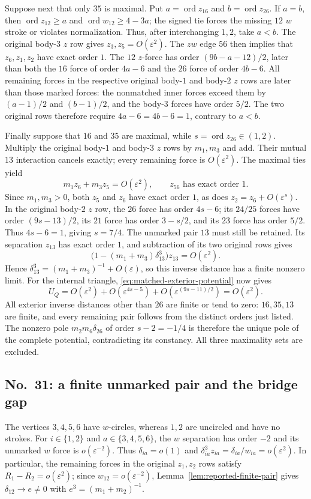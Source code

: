 \documentclass[11pt]{amsart}
\theoremstyle{remark}
\newcommand{\ord}{\operatorname{ord}}
\begin{document}
Suppose next that only $35$ is maximal. Put $a=\ord z_{16}$ and $b=\ord z_{26}$.
If $a=b$, then $\ord z_{12}\ge a$ and $\ord w_{12}\ge4-3a$; the signed tie forces the missing $12$ $w$ stroke or violates normalization. Thus, after interchanging $1,2$, take $a<b$.
The original body-$3$ $z$ row gives $z_3,z_5=O(\varepsilon^2)$.
The $zw$ edge $56$ then implies that $z_6,z_1,z_2$ have exact order $1$.
The $12$ $z$-force has order $(9b-a-12)/2$, later than both the $16$ force of order $4a-6$ and the $26$ force of order $4b-6$.
All remaining forces in the respective original body-$1$ and body-$2$ $z$ rows are later than those marked forces: the nonmatched inner forces exceed them by $(a-1)/2$ and $(b-1)/2$, and the body-$3$ forces have order $5/2$.
The two original rows therefore require $4a-6=4b-6=1$, contrary to $a<b$.

Finally suppose that $16$ and $35$ are maximal, while $s=\ord z_{26}\in(1,2)$.
Multiply the original body-$1$ and body-$3$ $z$ rows by $m_1,m_3$ and add.
Their mutual $13$ interaction cancels exactly; every remaining force is $O(\varepsilon^2)$.
The maximal ties yield
\[
 m_1z_6+m_3z_5=O(\varepsilon^2),\qquad
 z_{56}\text{ has exact order }1.
\]
Since $m_1,m_3>0$, both $z_5$ and $z_6$ have exact order $1$, as does $z_2=z_6+O(\varepsilon^s)$.
In the original body-$2$ $z$ row, the $26$ force has order $4s-6$; its $24/25$ forces have order $(9s-13)/2$, its $21$ force has order $3-s/2$, and its $23$ force has order $5/2$.
Thus $4s-6=1$, giving $s=7/4$.
The unmarked pair $13$ must still be retained. Its separation $z_{13}$ has exact order $1$, and subtraction of its two original rows gives
\[
 \bigl(1-(m_1+m_3)\delta_{13}^3\bigr)z_{13}=O(\varepsilon^2).
\]
Hence $\delta_{13}^3=(m_1+m_3)^{-1}+O(\varepsilon)$, so this inverse distance has a finite nonzero limit.
For the internal triangle, \eqref{eq:matched-exterior-potential} now gives
\[
 U_Q=O(\varepsilon^2)+O(\varepsilon^{4s-5})
       +O(\varepsilon^{(9s-11)/2})=O(\varepsilon^2).
\]
All exterior inverse distances other than $26$ are finite or tend to zero: $16,35,13$ are finite, and every remaining pair follows from the distinct orders just listed.
The nonzero pole $m_2m_6\delta_{26}$ of order $s-2=-1/4$ is therefore the unique pole of the complete potential, contradicting its constancy. All three maximality sets are excluded.

\subsection{No.~31: a finite unmarked pair and the bridge gap}\label{sec:no31-bridge}
The vertices $3,4,5,6$ have $w$-circles, whereas $1,2$ are uncircled and have no strokes. For $i\in\{1,2\}$ and $a\in\{3,4,5,6\}$, the $w$ separation has order $-2$ and its unmarked $w$ force is $o(\varepsilon^{-2})$. Thus $\delta_{ia}=o(1)$ and $\delta_{ia}^3z_{ia}=\delta_{ia}/w_{ia}=o(\varepsilon^2)$. In particular, the remaining forces in the original $z_1,z_2$ rows satisfy $R_1-R_2=o(\varepsilon^2)$; since $w_{12}=o(\varepsilon^{-2})$, Lemma~\ref{lem:reported-finite-pair} gives $\delta_{12}\to e\ne0$ with $e^3=(m_1+m_2)^{-1}$.
\end{document}
